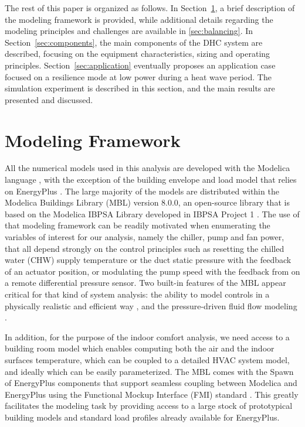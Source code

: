 The rest of this paper is organized as follows.
In Section~\ref{sec:modeling}, a brief description of the modeling framework is provided, while additional details regarding the modeling principles and challenges are available in \ref{sec:balancing}.
In Section~\ref{sec:components}, the main components of the DHC system are described, focusing on the equipment characteristics, sizing and operating principles.
Section~\ref{sec:application} eventually proposes an application case focused on a resilience mode at low power during a heat wave period. The simulation experiment is described in this section, and the main results are presented and discussed.


\section{Modeling Framework} \label{sec:modeling}

All the numerical models used in this analysis are developed with the Modelica language \citep{MattssonElmqvist1997:1}, with the exception of the building envelope and load model that relies on EnergyPlus \citep{Crawley2000}.
The large majority of the models are distributed within the Modelica Buildings Library (MBL) version 8.0.0, an open-source library that is based on the Modelica IBPSA Library \citep{Wetter2015} developed in IBPSA Project 1 \citep{Wetter2019b}.
The use of that modeling framework can be readily motivated when enumerating the variables of interest for our analysis, namely the chiller, pump and fan power, that all depend strongly on the control principles such as resetting the chilled water (CHW) supply temperature or the duct static pressure with the feedback of an actuator position, or modulating the pump speed with the feedback from on a remote differential pressure sensor.
Two built-in features of the MBL appear critical for that kind of system analysis: the ability
to model controls in a physically realistic and efficient way \citep{Wetter2021}, and the pressure-driven fluid flow modeling \citep{Wetter2011b}.

In addition, for the purpose of the indoor comfort analysis, we need access to a building room model which enables computing both the air and the indoor surfaces temperature, which can be coupled to a detailed HVAC system model, and ideally which can be easily parameterized.
The MBL comes with the Spawn of EnergyPlus components \citep{Wetter2020} that support seamless coupling between Modelica and EnergyPlus using the Functional Mockup Interface (FMI) standard \citep{Blochwitz2011}. This greatly facilitates the modeling task by providing access to a large stock of prototypical building models and standard load profiles already available for EnergyPlus.


